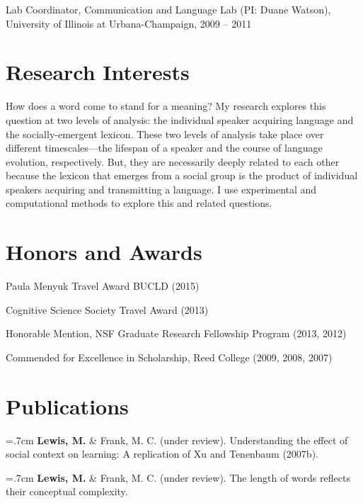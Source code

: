 \documentclass[letterpaper]{article}
\renewenvironment{itemize}{
  \begin{list}{}{
    \setlength{\leftmargin}{1.5em}
  }
}{
  \end{list}
}
\begin{document}
\begin{itemize}
\item Lab Coordinator, Communication and Language Lab (PI: Duane Watson), University of Illinois at Urbana-Champaign,  2009 -- 2011

\end{itemize}

\section*{Research Interests}

How does a word come to stand for a meaning? My research explores this question at two levels of analysis: the individual speaker acquiring language and the socially-emergent lexicon. These two levels of analysis take place over different timescales---the lifespan of a speaker and the course of language evolution, respectively. But, they are necessarily deeply related to each other because the lexicon that emerges from a social group is the product of individual speakers acquiring and transmitting a language. I use experimental and computational methods to explore this and related questions.
		

\section*{ Honors and Awards}
\begin{itemize}
\item  Paula Menyuk Travel Award BUCLD (2015)
\item Cognitive Science Society Travel Award (2013)
\item Honorable Mention, NSF Graduate Research Fellowship Program (2013, 2012)
\item Commended for Excellence in Scholarship, Reed College (2009, 2008, 2007)
\end{itemize}

\section*{Publications}

  \hangindent=.7cm {\bf Lewis, M.} \& Frank, M. C. (under review). Understanding the effect of social context on learning: A replication of Xu and Tenenbaum (2007b).

 \hangindent=.7cm {\bf Lewis, M.} \& Frank, M. C. (under review). The length of words reflects their conceptual complexity.
  
\end{document}
